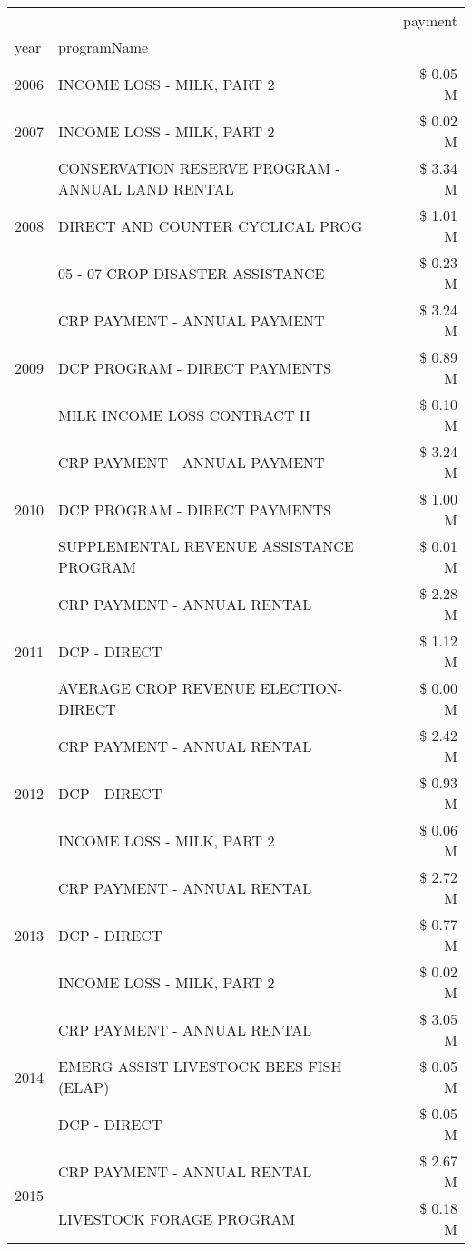 \begin{tabular}{llr}
\toprule
 &  & payment \\
year & programName &  \\
\midrule
2006 & INCOME LOSS - MILK, PART 2 & \$ 0.05 M \\
\cline{1-3}
2007 & INCOME LOSS - MILK, PART 2 & \$ 0.02 M \\
\cline{1-3}
\multirow[t]{3}{*}{2008} & CONSERVATION RESERVE PROGRAM - ANNUAL LAND RENTAL & \$ 3.34 M \\
 & DIRECT AND COUNTER CYCLICAL PROG & \$ 1.01 M \\
 & 05 - 07 CROP DISASTER ASSISTANCE & \$ 0.23 M \\
\cline{1-3}
\multirow[t]{3}{*}{2009} & CRP PAYMENT - ANNUAL PAYMENT & \$ 3.24 M \\
 & DCP PROGRAM - DIRECT PAYMENTS & \$ 0.89 M \\
 & MILK INCOME LOSS CONTRACT II & \$ 0.10 M \\
\cline{1-3}
\multirow[t]{3}{*}{2010} & CRP PAYMENT - ANNUAL PAYMENT & \$ 3.24 M \\
 & DCP PROGRAM - DIRECT PAYMENTS & \$ 1.00 M \\
 & SUPPLEMENTAL REVENUE ASSISTANCE PROGRAM & \$ 0.01 M \\
\cline{1-3}
\multirow[t]{3}{*}{2011} & CRP PAYMENT - ANNUAL RENTAL & \$ 2.28 M \\
 & DCP - DIRECT & \$ 1.12 M \\
 & AVERAGE CROP REVENUE ELECTION-DIRECT & \$ 0.00 M \\
\cline{1-3}
\multirow[t]{3}{*}{2012} & CRP PAYMENT - ANNUAL RENTAL & \$ 2.42 M \\
 & DCP - DIRECT & \$ 0.93 M \\
 & INCOME LOSS - MILK, PART 2 & \$ 0.06 M \\
\cline{1-3}
\multirow[t]{3}{*}{2013} & CRP PAYMENT - ANNUAL RENTAL & \$ 2.72 M \\
 & DCP - DIRECT & \$ 0.77 M \\
 & INCOME LOSS - MILK, PART 2 & \$ 0.02 M \\
\cline{1-3}
\multirow[t]{3}{*}{2014} & CRP PAYMENT - ANNUAL RENTAL & \$ 3.05 M \\
 & EMERG ASSIST LIVESTOCK BEES FISH (ELAP) & \$ 0.05 M \\
 & DCP - DIRECT & \$ 0.05 M \\
\cline{1-3}
\multirow[t]{3}{*}{2015} & CRP PAYMENT - ANNUAL RENTAL & \$ 2.67 M \\
 & LIVESTOCK FORAGE PROGRAM & \$ 0.18 M \\

\end{tabular}
